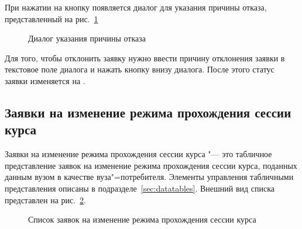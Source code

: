 При нажатии на кнопку  появляется диалог для указания причины отказа, 
представленный на рис.~\ref{img:student:req_detail_decline}
\begin{figure}[H]
	\caption{Диалог указания причины отказа}
	\label{img:student:req_detail_decline}
\end{figure}
Для того, чтобы отклонить заявку нужно ввести причину отклонения заявки в текстовое поле диалога 
и нажать кнопку  внизу диалога. После этого статус заявки изменяется на .


\subsection{Заявки на изменение режима прохождения сессии курса}

Заявки на изменение режима прохождения сессии курса "--- это табличное представление заявок на изменение 
режима прохождения сессии курса, поданных данным вузом в качестве вуза"=потребителя. 
Элементы управления табличными представления описаны в подразделе~\ref{sec:datatables}.
Внешний вид списка представлен на рис.~\ref{img:student:change_mode_req_list}. 

\begin{figure}[H]
	\caption{Список заявок на изменение режима прохождения сессии курса}
	\label{img:student:change_mode_req_list}
\end{figure}

